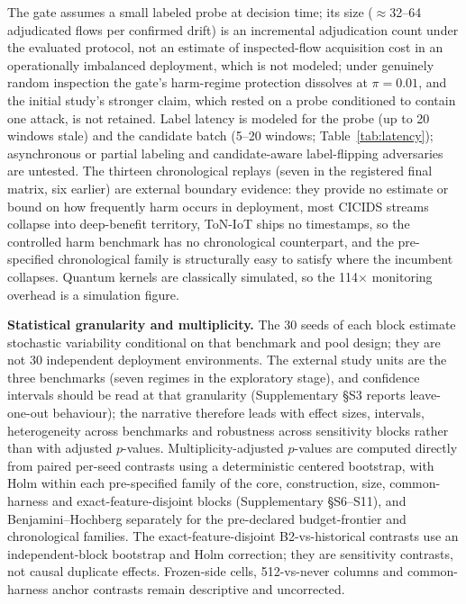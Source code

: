 \documentclass[journal]{IEEEtran}
\begin{document}
The gate assumes a small labeled probe at decision time; its size ($\approx$32--64 adjudicated flows per confirmed drift) is an incremental adjudication count under the evaluated protocol, not an estimate of inspected-flow acquisition cost in an operationally imbalanced deployment, which is not modeled; under genuinely random inspection the gate's harm-regime protection dissolves at $\pi = 0.01$, and the initial study's stronger claim, which rested on a probe conditioned to contain one attack, is not retained. Label latency is modeled for the probe (up to 20 windows stale) and the candidate batch (5--20 windows; Table~\ref{tab:latency}); asynchronous or partial labeling and candidate-aware label-flipping adversaries are untested. The thirteen chronological replays (seven in the registered final matrix, six earlier) are external boundary evidence: they provide no estimate or bound on how frequently harm occurs in deployment, most CICIDS streams collapse into deep-benefit territory, ToN-IoT ships no timestamps, so the controlled harm benchmark has no chronological counterpart, and the pre-specified chronological family is structurally easy to satisfy where the incumbent collapses. Quantum kernels are classically simulated, so the 114$\times$ monitoring overhead is a simulation figure.

\textbf{Statistical granularity and multiplicity.} The 30 seeds of each block estimate stochastic variability conditional on that benchmark and pool design; they are not 30 independent deployment environments. The external study units are the three benchmarks (seven regimes in the exploratory stage), and confidence intervals should be read at that granularity (Supplementary \S S3 reports leave-one-out behaviour); the narrative therefore leads with effect sizes, intervals, heterogeneity across benchmarks and robustness across sensitivity blocks rather than with adjusted $p$-values. Multiplicity-adjusted $p$-values are computed directly from paired per-seed contrasts using a deterministic centered bootstrap, with Holm \cite{holm1979simple} within each pre-specified family of the core, construction, size, common-harness and exact-feature-disjoint blocks (Supplementary \S S6--S11), and Benjamini--Hochberg \cite{benjamini1995controlling} separately for the pre-declared budget-frontier and chronological families. The exact-feature-disjoint B2-vs-historical contrasts use an independent-block bootstrap and Holm correction; they are sensitivity contrasts, not causal duplicate effects. Frozen-side cells, 512-vs-never columns and common-harness anchor contrasts remain descriptive and uncorrected.
\end{document}
